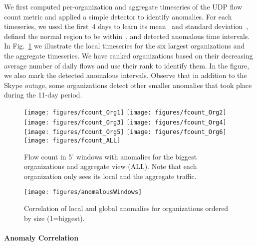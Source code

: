 \documentclass[letterpaper,11pt,onecolumn,titlepage]{article}
\begin{document}
We first computed per-organization and aggregate timeseries of the UDP
flow count metric and applied a simple detector to identify
anomalies. For each timeseries, we used the first~4 days to learn its
mean~ and standard deviation~, defined the normal region
to be within~, and detected anomalous time intervals. In
Fig.~\ref{fig:flows} we illustrate the local timeseries for the six
largest organizations and the aggregate timeseries. We have ranked
organizations based on their decreasing average number of daily flows
and use their rank to identify them. In the figure, we also mark the
detected anomalous intervals. Observe that in addition to the Skype
outage, some organizations detect other smaller anomalies that took
place during the 11-day period.




\begin{figure}[t]
	\centering 
	\begin{minipage}{0.6\textwidth}
		\texttt{[image: figures/fcount\_Org1]} \vspace{-1pt}
		\texttt{[image: figures/fcount\_Org2]} \vspace{-1pt}
		\texttt{[image: figures/fcount\_Org3]} \vspace{-1pt}
		\texttt{[image: figures/fcount\_Org4]} \vspace{-1pt}
		\texttt{[image: figures/fcount\_Org5]} \vspace{-1pt}
		\texttt{[image: figures/fcount\_Org6]} \vspace{-1pt}
		\texttt{[image: figures/fcount\_ALL]}
	\end{minipage}
	\caption{Flow count in 5' windows with anomalies for the biggest organizations and aggregate view (ALL). Note that
		each organization only sees its local and the aggregate traffic.}
	\label{fig:flows}
\end{figure}

\begin{figure}[t]
	\centering
	\texttt{[image: figures/anomalousWindows]}
	\caption{Correlation of local and global anomalies for organizations ordered by size (1=biggest).}
	\label{fig:anomalyCorrelation} 
\end{figure}







\paragraph{Anomaly Correlation}
\end{document}
